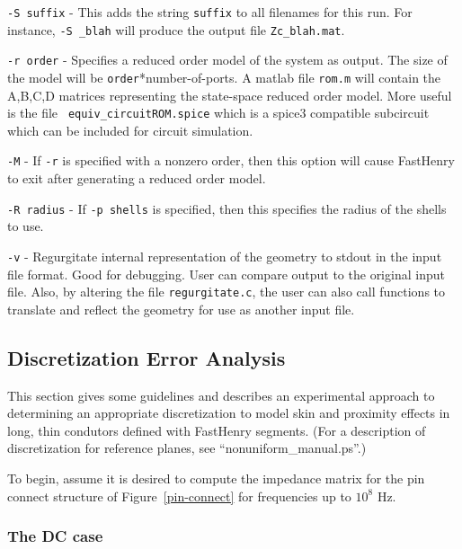 \vspace{0.2in}
{\tt -S suffix} - This adds the string {\tt suffix} to all filenames
for this run.  For instance, {\tt -S \_blah} will produce the output file
{\tt Zc\_blah.mat}.

\vspace{0.2in}
{\tt -r order} - Specifies a reduced order model of the system as
output.  The size of the model will be {\tt order}*number-of-ports. A
matlab file {\tt rom.m} will contain the A,B,C,D matrices representing
the state-space reduced order model. More useful is the file {\tt
  equiv\_circuitROM.spice} which is a spice3 compatible subcircuit
which can be included for circuit simulation.

\vspace{0.2in}
{\tt -M} - If {\tt -r} is specified with a nonzero order, then this
option will cause FastHenry to exit after generating a reduced order
model.

\vspace{0.2in}
{\tt -R radius} - If {\tt -p shells} is specified, then this specifies the
radius of the shells to use.

\vspace{0.2in}
{\tt -v} - Regurgitate internal representation of the geometry to
stdout in the input file format.  
Good for debugging. User can compare output to the original input
file.  Also, by altering the file {\tt regurgitate.c}, the user can
also call functions to translate and reflect the geometry for use as
another input file.

\subsection{Discretization Error Analysis}
\label{discret}

This section gives some guidelines and describes an experimental
approach to determining an appropriate discretization to model skin
and proximity effects in long, thin condutors defined with
FastHenry segments.  (For a description of discretization for reference
planes, see ``nonuniform\_manual.ps''.)

To begin, assume it is desired to compute the impedance matrix for the pin
connect structure of Figure~\ref{pin-connect} for frequencies up to
$10^8$ Hz. 

\subsubsection{The DC case}
\label{DC}

